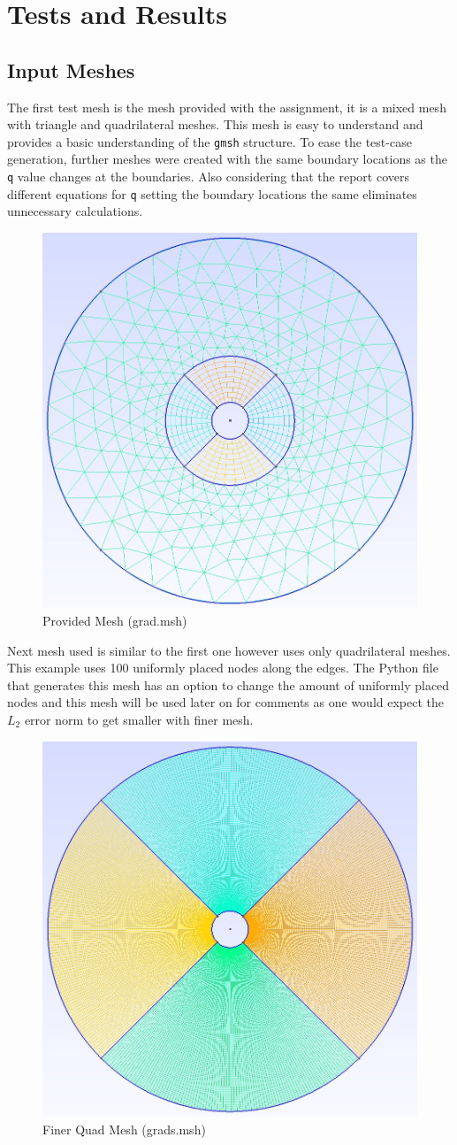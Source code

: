 \documentclass[a4paper, 12pt]{article}
\begin{document}
\section{Tests and Results}
\subsection{Input Meshes}
The first test mesh is the mesh provided with the assignment, it is a mixed mesh with triangle and quadrilateral meshes. This mesh is easy to understand and provides a basic understanding of the \verb|gmsh| structure. To ease the test-case generation, further meshes were created with the same boundary locations as the \verb|q| value changes at the boundaries. Also considering that the report covers different equations for \verb|q| setting the boundary locations the same eliminates unnecessary calculations.\\\par
\begin{figure}[H]
    \centering
    \includegraphics[width=0.3\linewidth]{grad.jpg}
    \caption{Provided Mesh (grad.msh)}
\end{figure}\par
Next mesh used is similar to the first one however uses only quadrilateral meshes. This example uses 100 uniformly placed nodes along the edges. The Python file that generates this mesh has an option to change the amount of uniformly placed nodes and this mesh will be used later on for comments as one would expect the $L_2$ error norm to get smaller with finer mesh.\\\par \label{here}
\begin{figure}[H]
    \centering
    \includegraphics[width=0.3\linewidth]{grads.jpg}
    \caption{Finer Quad Mesh (grads.msh)}
\end{figure}
\end{document}
